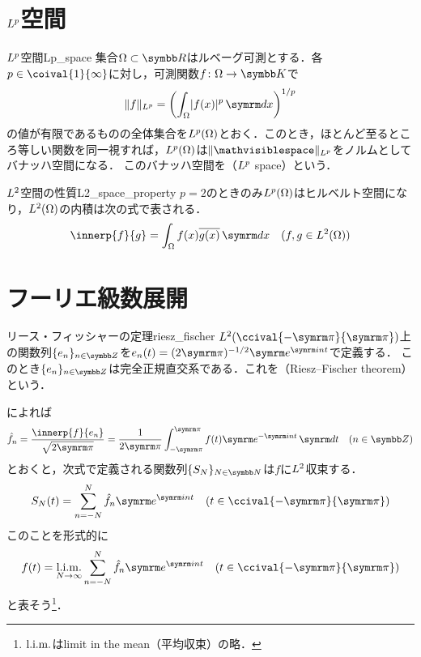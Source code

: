 \documentclass[../../main]{subfiles}
\begin{document}
\section{\texorpdfstring{\(L^p\)}{Lp}空間}
\label{section:lp_space}

\begin{definition}{\(L^p\)空間}{Lp_space}
  集合\(\Omega\subset\numset{R}\)はルベーグ可測とする．各\(p\in\coival{1}{\infty}\)に対し，可測関数\(f\colon\Omega\to\numset{K}\)で
  \[
    \vnorm{f}_{\Lebesgue{p}} = \pqty*{\int_\Omega\abs{f(x)}^p\intd{x}}^{1/p}
  \]
  の値が有限であるものの全体集合を\(L^p(\Omega)\)とおく．このとき，ほとんど至るところ等しい関数を同一視すれば，\(L^p(\Omega)\)は\(\vnorm{\holder}_{\Lebesgue{p}}\)をノルムとしてバナッハ空間になる．
  このバナッハ空間を（\(L^p\) space）という．
\end{definition}

\begin{proposition}{\(L^2\)空間の性質}{L2_space_property}
  \(p=2\)のときのみ\(L^p(\Omega)\)はヒルベルト空間になり，\(L^2(\Omega)\)の内積は次の式で表される．
  \[
    \innerp{f}{g} = \int_\Omega f(x)\conj*{g(x)}\intd{x}\quad(f,g\in\Lebesgue{2}(\Omega))
  \]
\end{proposition}

\section{フーリエ級数展開}

\begin{theorem}{リース・フィッシャーの定理}{riesz_fischer}
  \(\Lebesgue{2}(\ccival{-\krez}{\krez})\)上の関数列\(\seq{e_n}_{n\in\numset{Z}}\)を\(e_n(t)=(2\krez)^{-1/2}\napr^{\iuni nt}\)で定義する．
  このとき\(\seq{e_n}_{n\in\numset{Z}}\)は完全正規直交系である．これを（Riesz–Fischer theorem）という．
\end{theorem}

によれば
\[
  \hat{f}_n = \frac{\innerp{f}{e_n}}{\sqrt{2\krez}}
  = \frac{1}{2\krez}\int_{-\krez}^{\krez}f(t)\napr^{-\iuni nt}\intd{t}\quad(n\in\numset{Z})
\]
とおくと，次式で定義される関数列\(\seq{S_N}_{N\in\numset{N}}\)は\(f\)に\(L^2\)収束する．
\[
  S_N(t) = \sum_{n=-N}^N\hat{f}_n\napr^{\iuni nt}\quad(t\in\ccival{-\krez}{\krez})
\]
このことを形式的に
\[
  f(t) = \sqlim_{N\to\infty}\sum_{n=-N}^N\hat{f}_n\napr^{\iuni nt}\quad(t\in\ccival{-\krez}{\krez})
\]
と表そう\footnote{\(\operatorname*{l{.}i{.}m{.}}\)はlimit in the mean（平均収束）の略．}．
\end{document}
